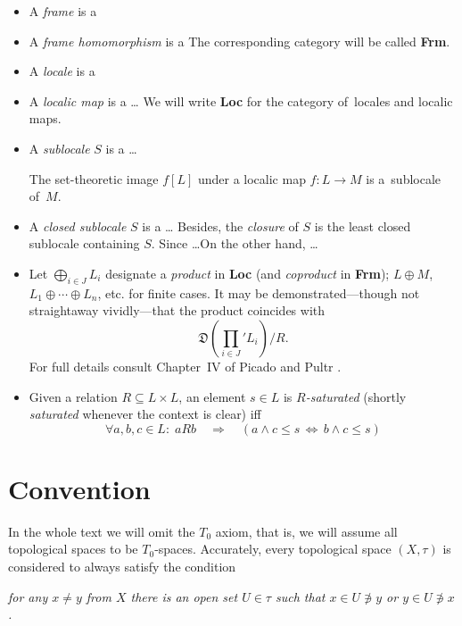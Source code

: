 \begin{itemize}
\item A \emph{frame} is a
\item A \emph{frame homomorphism} is a
The corresponding category will be called {\bf Frm}.
\item A \emph{locale} is a
\item A \emph{localic map} is a \ldots
We will write {\bf Loc} for the category of~locales and localic maps.
\item A \emph{sublocale} $S$ is a \ldots
  \begin{fact}
    The set-theoretic image $f[L]$ under a localic map $f\colon L\to M$
    is a~sublocale of~$M$.
  \end{fact}
\item A \emph{closed sublocale} $S$ is a \ldots
Besides, the \emph{closure} of $S$ is the least closed sublocale containing $S$.
Since \ldots On the other hand, \ldots
\item Let $\bigoplus_{i\in J} L_i$ designate a \emph{product} in {\bf Loc} (and
\emph{coproduct} in {\bf Frm}); $L \oplus M$, $L_1 \oplus\cdots\oplus L_n$, etc.
for finite cases.
It may be demonstrated---though not straightaway vividly---that the product
coincides with
\[
  \textstyle\mathfrak{D}\left(\prod_{i\in J}' L_{i}\right)/R.
\]
For full details consult Chapter~IV of Picado and Pultr \cite{picado-pultr12}.
\item Given a relation $R\subseteq L \times L$, an element $s\in L$ is
\emph{$R$-saturated} (shortly \emph{saturated} whenever the context is clear)
  iff
\[
  \forall a, b, c\in L: \; aRb \quad \Rightarrow \quad \left( a \wedge c \leq s
  \, \Leftrightarrow \, b \wedge c \leq s \right)
\]
\end{itemize}

\section*{Convention}

In the whole text we will omit the $T_0$ axiom, that is, we will assume all
topological spaces to be $T_0$-spaces.
Accurately, every topological space $(X, \tau)$ is considered to always satisfy
the condition
\begin{center} \it
  for any $x \ne y$ from $X$ there is an open set $U \in \tau$ such that $x \in U
  \not\owns y$ or $y \in U \not\owns x$.
\end{center}

